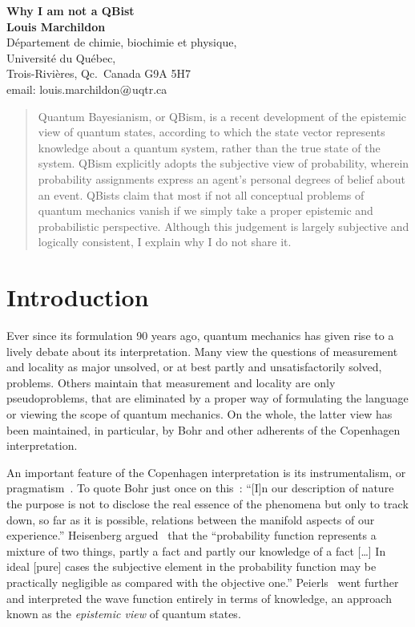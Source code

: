 \documentclass[12pt]{article}
\begin{document}
%
\begin{center}
\LARGE
\textbf{Why I am not a QBist}\\[1cm]
\large
\textbf{Louis Marchildon}\\[0.5cm]
\normalsize
D\'{e}partement de chimie, biochimie et physique,\\
Universit\'{e} du Qu\'{e}bec,\\
Trois-Rivi\`{e}res, Qc.\ Canada G9A 5H7\\
email: louis.marchildon$\hspace{0.3em}a\hspace{-0.8em}
\bigcirc$uqtr.ca\\
\end{center}
%
\medskip
%
%
\begin{abstract}
Quantum Bayesianism, or QBism, is a
recent development of the epistemic view
of quantum states, according to which
the state vector represents knowledge
about a quantum system, rather than the
true state of the system.  QBism explicitly
adopts the subjective view of probability,
wherein probability assignments express
an agent's personal degrees of belief
about an event.  QBists claim that most
if not all conceptual problems of quantum
mechanics vanish if we simply take a
proper epistemic and probabilistic
perspective.  Although this judgement
is largely subjective and logically
consistent, I explain why I do not share it.
\end{abstract}
%
\section{Introduction\label{S1}}
%
Ever since its formulation 90 years
ago, quantum mechanics has given rise
to a lively debate about
its interpretation.  Many view the questions
of measurement and locality as major
unsolved, or at best partly and
unsatisfactorily solved, problems.
Others maintain that measurement
and locality are only pseudoproblems,
that are eliminated by a proper way of
formulating the language or viewing the
scope of quantum mechanics.  On the whole,
the latter view has been maintained, in
particular, by Bohr and other adherents
of the Copenhagen interpretation.

An important feature of the Copenhagen
interpretation is its instrumentalism,
or pragmatism~\cite{stapp}.  To quote Bohr
just once on this~\cite{bohr}:
``[I]n our description of nature the
purpose is not to disclose the real essence
of the phenomena but only to track down,
so far as it is possible, relations
between the manifold aspects of our experience.''
Heisenberg argued~\cite{heisenberg} that
the ``probability function represents a
mixture of two things, partly a fact
and partly our knowledge of a fact
\mbox{[\ldots]}  In ideal [pure] cases
the subjective element in the probability
function may be practically negligible
as compared with the objective one.''
Peierls~\cite{peierls} went further and
interpreted the wave function entirely
in terms of knowledge, an approach
known as the \emph{epistemic view} of
quantum states.
\end{document}
